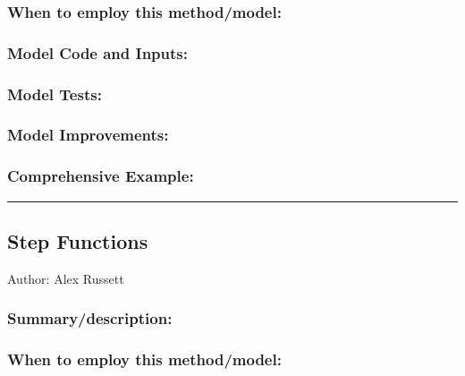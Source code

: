 \documentclass[
]{article}
\begin{document}
\hypertarget{when-to-employ-this-methodmodel-4}{%
\subsubsection{When to employ this
method/model:}\label{when-to-employ-this-methodmodel-4}}

\hypertarget{model-code-and-inputs-4}{%
\subsubsection{Model Code and Inputs:}\label{model-code-and-inputs-4}}

\hypertarget{model-tests-4}{%
\subsubsection{Model Tests:}\label{model-tests-4}}

\hypertarget{model-improvements-4}{%
\subsubsection{Model Improvements:}\label{model-improvements-4}}

\hypertarget{comprehensive-example-4}{%
\subsubsection{Comprehensive Example:}\label{comprehensive-example-4}}

\begin{center}\rule{0.5\linewidth}{0.5pt}\end{center}

\hypertarget{step-functions}{%
\subsection{Step Functions}\label{step-functions}}

Author: Alex Russett

\hypertarget{summarydescription-5}{%
\subsubsection{Summary/description:}\label{summarydescription-5}}

\hypertarget{when-to-employ-this-methodmodel-5}{%
\subsubsection{When to employ this
method/model:}\label{when-to-employ-this-methodmodel-5}}
\end{document}
